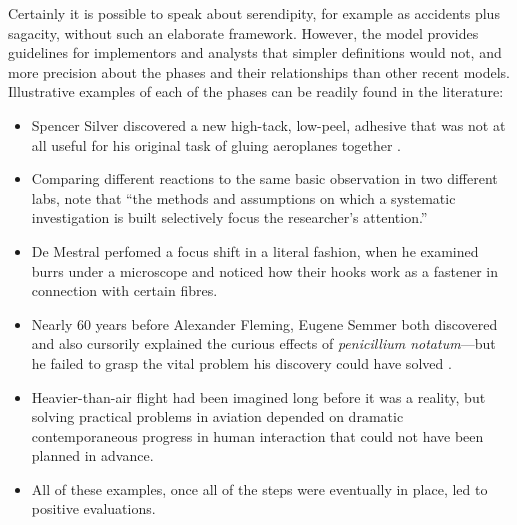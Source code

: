 Certainly it is possible to speak about serendipity, for example as
accidents plus sagacity, without such an elaborate framework.
However, the model provides guidelines for implementors and analysts
that simpler definitions would not, and more precision about the
phases and their relationships than other recent models.  Illustrative
examples of each of the phases can be readily found in the literature:
\begin{itemize}
\item Spencer Silver discovered a new high-tack, low-peel, adhesive
  that was not at all useful for his original task of gluing
  aeroplanes together \cite{tce-postits}.
\item Comparing different reactions to the same basic observation in
  two different labs, \citet[p.~131]{floppyearedrabbits1958barber}
  note that ``the methods and assumptions on which a systematic
  investigation is built selectively focus the researcher's
  attention.''
\item De Mestral perfomed a focus shift in a literal fashion, when he
  examined burrs under a microscope and noticed how their hooks work
  as a fastener in connection with certain fibres.
\item Nearly 60 years before Alexander Fleming, Eugene Semmer both
  discovered and also cursorily explained the curious effects of
  \emph{penicillium notatum}---but he failed to grasp the vital
  problem his discovery could have solved
  \cite[p.~75]{cropley2013creativity}.
\item
  Heavier-than-air flight had been imagined long before it was a
  reality, but solving practical problems in aviation depended on
  dramatic contemporaneous progress in human interaction
  \cite[p.~292]{spenser2008airplane} that could not have been planned
  in advance.
\item All of these examples, once all of the steps were eventually in
  place, led to positive evaluations.
\end{itemize}


